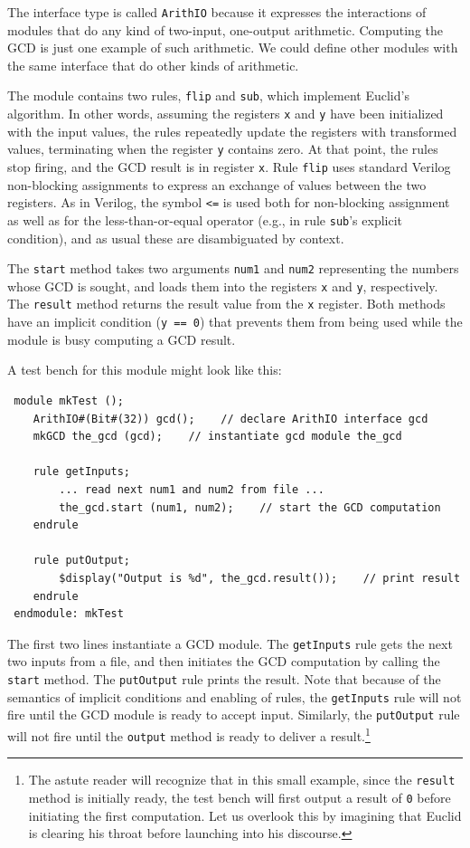 \documentclass[twoside,letterpaper]{article}
\newcommand{\V}{Verilog}
\begin{document}
The interface type is called \texttt{ArithIO} because it expresses the
interactions of modules that do any kind of two-input, one-output
arithmetic.  Computing the GCD is just one example of such arithmetic.
We could define other modules with the same interface that do other
kinds of arithmetic.

The module contains two rules, \texttt{flip} and \texttt{sub}, which
implement Euclid's algorithm.  In other words, assuming the registers
\texttt{x} and \texttt{y} have been initialized with the input values, the
rules repeatedly update the registers with transformed values,
terminating when the register \texttt{y} contains zero.  At that point,
the rules stop firing, and the GCD result is in register \texttt{x}.
Rule \texttt{flip} uses standard {\V} non-blocking assignments to express
an exchange of values between the two registers.  As in {\V}, the
symbol \texttt{<=} is used both for non-blocking assignment as well as
for the less-than-or-equal operator (e.g., in rule \texttt{sub}'s
explicit condition), and as usual these are disambiguated by context.

The \texttt{start} method takes two arguments \texttt{num1} and
\texttt{num2} representing the numbers whose GCD is sought, and loads
them into the registers \texttt{x} and \texttt{y}, respectively.  The
\texttt{result} method returns the result value from the \texttt{x}
register.  Both methods have an implicit condition (\mbox{\texttt{y ==
0}}) that prevents them from being used while the module is busy
computing a GCD result.

A test bench for this module might look like this:

\begin{verbatim}
 module mkTest ();
    ArithIO#(Bit#(32)) gcd();    // declare ArithIO interface gcd
    mkGCD the_gcd (gcd);    // instantiate gcd module the_gcd

    rule getInputs;
        ... read next num1 and num2 from file ...
        the_gcd.start (num1, num2);    // start the GCD computation
    endrule

    rule putOutput;
        $display("Output is %d", the_gcd.result());    // print result
    endrule
 endmodule: mkTest
\end{verbatim}


The first two lines instantiate a GCD module.  The \texttt{getInputs}
rule gets the next two inputs from a file, and then initiates the GCD
computation by calling the \texttt{start} method.  The
\texttt{putOutput} rule prints the result.  Note that because of the
semantics of implicit conditions and enabling of rules, the
\texttt{getInputs} rule will not fire until the GCD module is ready to
accept input.  Similarly, the \texttt{putOutput} rule will not fire
until the {\tt output} method is ready to deliver a
result.\footnote{The astute reader will recognize that in this small
example, since the {\tt result} method is initially ready, the test
bench will first output a result of \texttt{0} before initiating the
first computation.  Let us overlook this by imagining that Euclid is
clearing his throat before launching into his discourse.  }
\end{document}
